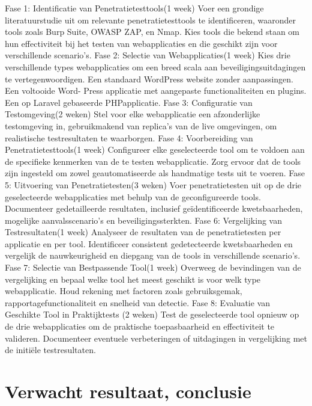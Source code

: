 Fase 1: Identificatie van Penetratietesttools(1
week) Voer een grondige literatuurstudie uit om
relevante penetratietesttools te identificeren, waaronder
tools zoals Burp Suite, OWASP ZAP, en Nmap.
Kies tools die bekend staan om hun effectiviteit bij
het testen van webapplicaties en die geschikt zijn
voor verschillende scenario's.
Fase 2: Selectie van Webapplicaties(1 week)
Kies drie verschillende types webapplicaties om
een breed scala aan beveiligingsuitdagingen te
vertegenwoordigen. Een standaard WordPress
website zonder aanpassingen. Een voltooide Word-
Press applicatie met aangepaste functionaliteiten
en plugins. Een op Laravel gebaseerde PHPapplicatie.
Fase 3: Configuratie van Testomgeving(2 weken)
Stel voor elke webapplicatie een afzonderlijke
testomgeving in, gebruikmakend van replica's
van de live omgevingen, om realistische testresultaten
te waarborgen.
Fase 4: Voorbereiding van Penetratietesttools(1
week) Configureer elke geselecteerde tool om te
voldoen aan de specifieke kenmerken van de te
testen webapplicatie. Zorg ervoor dat de tools zijn
ingesteld om zowel geautomatiseerde als handmatige
tests uit te voeren.
Fase 5: Uitvoering van Penetratietesten(3 weken)
Voer penetratietesten uit op de drie geselecteerde
webapplicaties met behulp van de geconfigureerde
tools. Documenteer gedetailleerde resultaten,
inclusief geïdentificeerde kwetsbaarheden,
mogelijke aanvalsscenario's en beveiligingssterkten.
Fase 6: Vergelijking van Testresultaten(1 week)
Analyseer de resultaten van de penetratietesten
per applicatie en per tool. Identificeer consistent
gedetecteerde kwetsbaarheden en vergelijk de
nauwkeurigheid en diepgang van de tools in verschillende
scenario's.
Fase 7: Selectie van Bestpassende Tool(1 week)
Overweeg de bevindingen van de vergelijking en
bepaal welke tool het meest geschikt is voor welk
type webapplicatie. Houd rekening met factoren
zoals gebruiksgemak, rapportagefunctionaliteit
en snelheid van detectie.
Fase 8: Evaluatie van Geschikte Tool in Praktijktests
(2 weken) Test de geselecteerde tool opnieuw
op de drie webapplicaties om de praktische
toepasbaarheid en effectiviteit te valideren.
Documenteer eventuele verbeteringen of uitdagingen
in vergelijking met de initiële testresultaten.
\section{Verwacht resultaat, conclusie}%
\label{sec:verwachte_resultaten}

